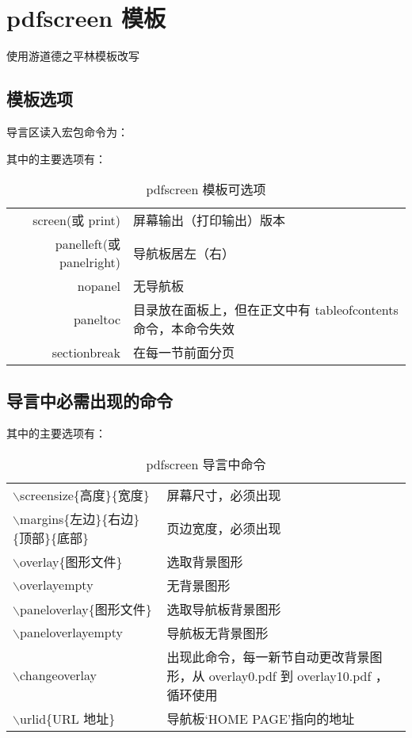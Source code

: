 \section{pdfscreen 模板}
使用游道德之平林模板改写
\subsection{模板选项}
导言区读入宏包命令为：\\

其中的主要选项有：\\
\begin{table}[htbp]
  \centering
  \caption{pdfscreen 模板可选项}\label{panel_pdfscreen}
\begin{tabularx}{14cm}{rX}
\toprule
  screen(或 print) & 屏幕输出（打印输出）版本 \\
  panelleft(或 panelright) & 导航板居左（右） \\
  nopanel & 无导航板 \\
paneltoc & 目录放在面板上，但在正文中有 tableofcontents 命令，本命令失效 \\
sectionbreak & 在每一节前面分页 \\
\bottomrule
\end{tabularx}
\end{table}

\subsection{导言中必需出现的命令}
其中的主要选项有：\\
\begin{table}[htbp]
  \centering
  \caption{pdfscreen 导言中命令}\label{command_pdfscreen}
\begin{tabularx}{14cm}{lX}
\toprule
  $\backslash$screensize\{高度\}\{宽度\} & 屏幕尺寸，必须出现 \\
  $\backslash$margins\{左边\}\{右边\}\{顶部\}\{底部\} & 页边宽度，必须出现 \\
  $\backslash$overlay\{图形文件\} & 选取背景图形 \\
  $\backslash$overlayempty & 无背景图形 \\
  $\backslash$paneloverlay\{图形文件\} & 选取导航板背景图形 \\
  $\backslash$paneloverlayempty & 导航板无背景图形 \\
 $\backslash$changeoverlay & 出现此命令，每一新节自动更改背景图形，从 overlay0.pdf 到 overlay10.pdf ，循环使用\\
 $\backslash$urlid\{URL 地址\} & 导航板‘HOME PAGE’指向的地址\\
\bottomrule
\end{tabularx}
\end{table}
